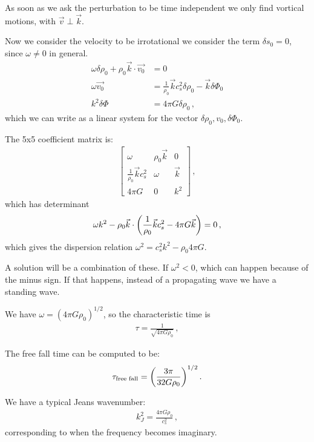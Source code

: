 \documentclass[main.tex]{subfiles}
\begin{document}
As soon as we ask the perturbation to be time independent we only find vortical motions, with \(\vec{v} \perp \vec{k}\). 

Now we consider the velocity to be irrotational we consider the term \(\delta s_0 =0\), since \(\omega \neq 0\) in general. 
%
\begin{align}
  \omega \delta \rho_0 + \rho_0 \vec{k} \cdot \vec{v_0} &=0  \\
  \omega \vec{v_0} &= \frac{1}{\rho_0 } \vec{k}
  c^2_s \delta \rho_0  
  - \vec{k} \delta \Phi_0 \\
  k^2 \delta \Phi &= 4 \pi G \delta \rho_0 
\,,
\end{align}
%
which we can write as a linear system for the vector \(\delta \rho_0 , v_0, \delta \Phi_0 \). 

The 5x5 coefficient matrix is:
%
\begin{align}
  \left[\begin{array}{ccc}
  \omega  & \rho_0 \vec{k}  & 0 \\ 
  \frac{1}{\rho_0 } \vec{k} c_s^2 & \omega  & \vec{k} \\ 
  4 \pi G & 0 & k^2
  \end{array}\right]
  \,,
\end{align}
%
which has determinant 
%
\begin{align}
  \omega k^2 - \rho_0 \vec{k} \cdot \qty( \frac{1}{\rho_0 }\vec{k} c_s^2 - 4 \pi G \vec{k} ) = 0
\,,
\end{align}
%
which gives the dispersion relation \(\omega^2 = c_s^2 k^2 - \rho_0 4 \pi G \). 

A solution will be a combination of these. If \(\omega^2<0\), which can happen because of the minus sign. If that happens, instead of a propagating wave we have a standing wave. 

We have \(\omega = (4 \pi G \rho_0  )^{1/2}\), so the characteristic time is 
%
\begin{align}
  \tau = \frac{1}{\sqrt{4 \pi G \rho_0 }}
\,,
\end{align}
%


The free fall time can be computed to be: 
%
\begin{align}
  \tau _{\text{free fall}} = \qty(\frac{3 \pi }{ 32 G \rho_0 })^{1/2}
\,.
\end{align}
%

We have a typical Jeans wavenumber: 
%
\begin{align}
  k_J^2 = \frac{4 \pi G \rho_0 }{c_s^2}
\,,
\end{align}
%
corresponding to when the frequency becomes imaginary. 
\end{document}
